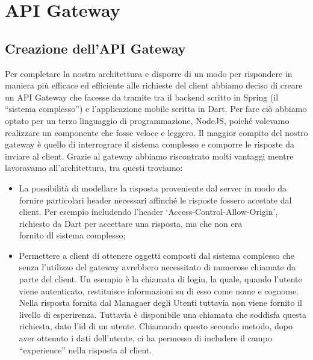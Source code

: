 \section{API Gateway}
\subsection{Creazione dell'API Gateway}
Per completare la nostra architettura e disporre di un modo per rispondere in maniera più efficace ed efficiente alle richieste del client abbiamo deciso di creare un API Gateway che facesse da tramite tra il backend scritto in Spring (il ``sistema complesso'') e l'applicazione mobile scritta in Dart. Per fare ciò abbiamo optato per un terzo linguaggio di programmazione, NodeJS, poiché volevamo realizzare un componente che fosse veloce e leggero. Il maggior compito del nostro gateway è quello di interrograre il sistema complesso e comporre le risposte da inviare al client. Grazie al gateway abbiamo riscontrato molti vantaggi mentre lavoravamo all'architettura, tra questi troviamo:
\begin{itemize}
  \item La possibilità di modellare la risposta proveniente dal server in modo da fornire particolari header necessari affinché le risposte fossero accetate dal client. Per esempio includendo l'header `Access-Control-Allow-Origin', richiesto da Dart per accettare una risposta, ma che non era \\ fornito dl sistema complesso;
  \item Permettere a client di ottenere oggetti composti dal sistema complesso che senza l'utilizzo del gateway avrebbero necessitato di numerose chiamate da parte del client. Un esempio è la chiamata di login, la quale, quando l'utente viene autenticato, restituisce informazioni su di esso come nome e cognome. Nella risposta fornita dal Managaer degli Utenti tuttavia non viene fornito il livello di esperirenza. Tuttavia è disponibile una chiamata che soddisfa questa richiesta, dato l'id di un utente. Chiamando questo secondo metodo, dopo aver ottenuto i dati dell'utente, ci ha permesso di includere il campo ``experience'' nella risposta al client.  
\end{itemize}
\newpage
